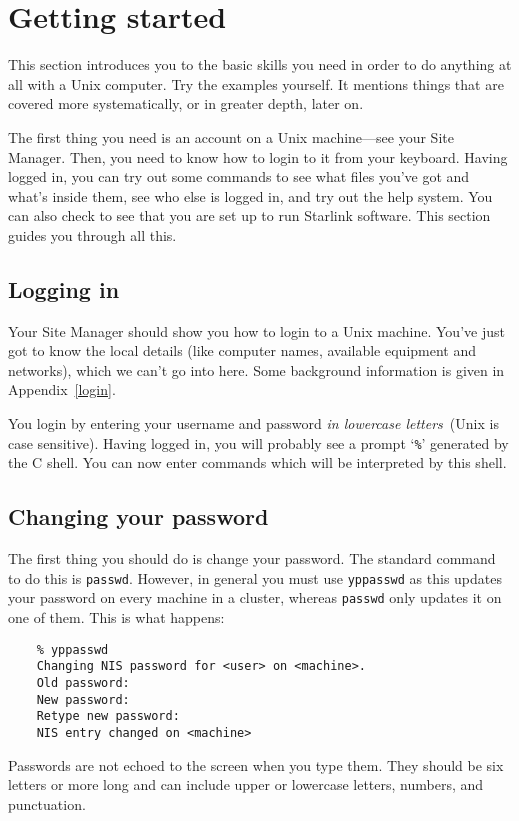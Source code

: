 \section{Getting started}

This section introduces you to the basic skills you need in order to do anything
at all with a Unix computer.
Try the examples yourself.
It mentions things that are covered more systematically, or in greater depth,
later on.

The first thing you need is an account on a Unix machine---see your Site
Manager.
Then, you need to know how to login to it from your keyboard.
Having logged in, you can try out some commands to see what files you've got
and what's inside them, see who else is logged in, and try out the help system.
You can also check to see that you are set up to run Starlink software.
This section guides you through all this.

\subsection{Logging in}

Your Site Manager should show you how to login to a Unix machine.
You've just got to know the local details (like computer names, available
equipment and networks), which we can't go into here.
Some background information is given in Appendix~\ref{login}.

You login by entering your username and password {\it in lowercase letters}\,
(Unix is case sensitive).
Having logged in, you will probably see a prompt `{\tt \%}' generated by the
C shell.
You can now enter commands which will be interpreted by this shell.

\subsection{Changing your password}

The first thing you should do is change your password.
The standard command to do this is {\tt passwd}.
However, in general you must use {\tt yppasswd} as this updates your password
on every machine in a cluster, whereas {\tt passwd} only updates it on one of
them.
This is what happens:
\begin{verbatim}
    % yppasswd
    Changing NIS password for <user> on <machine>.
    Old password:
    New password:
    Retype new password:
    NIS entry changed on <machine>
\end{verbatim}
Passwords are not echoed to the screen when you type them.
They should be six letters or more long and can include upper or lowercase
letters, numbers, and punctuation.


